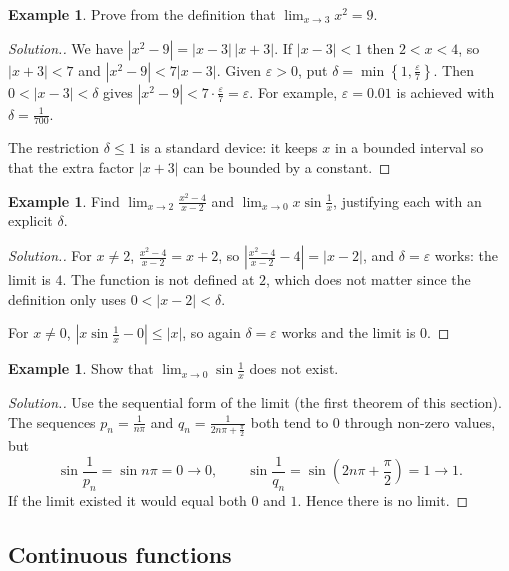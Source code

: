 \documentclass[11pt,a4paper]{article}
\numberwithin{equation}{section}
\theoremstyle{definition}
\newtheorem{exa}[thm]{Example}
\newenvironment{solution}
  {\renewcommand{\qedsymbol}{}\begin{proof}[\textit{Solution}.]}
  {\end{proof}}
\begin{document}
\begin{exa}
Prove from the definition that $\displaystyle\lim_{x\rightarrow 3} x^2 = 9$.
\end{exa}

\begin{solution}
We have $|x^2 - 9| = |x-3|\,|x+3|$. If $|x-3|<1$ then $2<x<4$, so $|x+3|<7$ and $|x^2-9|<7|x-3|$. Given $\varepsilon>0$, put $\delta = \min\left\{1,\frac{\varepsilon}{7}\right\}$. Then $0<|x-3|<\delta$ gives $|x^2 - 9|<7\cdot\frac{\varepsilon}{7} = \varepsilon$. For example, $\varepsilon = 0.01$ is achieved with $\delta = \frac{1}{700}$.

The restriction $\delta\leq1$ is a standard device: it keeps $x$ in a bounded interval so that the extra factor $|x+3|$ can be bounded by a constant.
\end{solution}

\begin{exa}
Find $\displaystyle\lim_{x\rightarrow 2}\frac{x^2-4}{x-2}$ and $\displaystyle\lim_{x\rightarrow 0} x\sin\frac{1}{x}$, justifying each with an explicit $\delta$.
\end{exa}

\begin{solution}
For $x\neq 2$, $\frac{x^2-4}{x-2} = x+2$, so $\left|\frac{x^2-4}{x-2} - 4\right| = |x-2|$, and $\delta = \varepsilon$ works: the limit is $4$. The function is not defined at $2$, which does not matter since the definition only uses $0<|x-2|<\delta$.

For $x\neq0$, $\left|x\sin\frac{1}{x} - 0\right|\leq|x|$, so again $\delta = \varepsilon$ works and the limit is $0$.
\end{solution}

\begin{exa}
Show that $\displaystyle\lim_{x\rightarrow 0}\sin\frac{1}{x}$ does not exist.
\end{exa}

\begin{solution}
Use the sequential form of the limit (the first theorem of this section). The sequences $p_n = \frac{1}{n\pi}$ and $q_n = \frac{1}{2n\pi+\frac{\pi}{2}}$ both tend to $0$ through non-zero values, but
$$\sin\frac{1}{p_n} = \sin n\pi = 0 \longrightarrow 0, \qquad \sin\frac{1}{q_n} = \sin\left(2n\pi+\frac{\pi}{2}\right) = 1\longrightarrow 1 .$$
If the limit existed it would equal both $0$ and $1$. Hence there is no limit.
\end{solution}


\subsection{Continuous functions}
\end{document}
